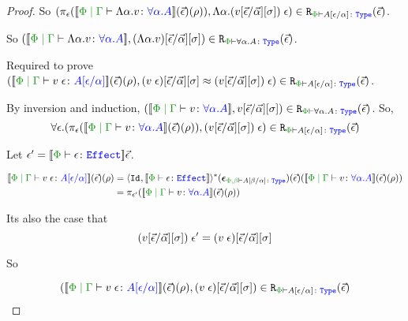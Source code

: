 \begin{framed}
\begin{proof}
        So $\inLogRelPE{    \pe(\deno{\gpetyperelation{\elam{\a}{v}}{\all{\a}{A}}}\fundRho)}{\eapp{\elam{\a}{(v\fundSub)}}{\e}}{A\ssub{\a}{\e}}$.
        
        So $\inLogRelPE{\deno{\gpetyperelation{\elam{\a}{v}}{\all{\a}{A}}}}{(\elam{\a}{v})\fundSub}{\all{\a}{A}}$.
        
        
        \case{\vspec}
        Required to prove $\inLogRelPE{\deno{\gpetyperelation{\eapp{v}{\e}}{A\ssub{\a}{\e}}}\fundRho}{(\eapp{v}{\e})\fundSub\beequiv\eapp{(v\fundSub)}{\e}}{A\ssub{\a}{\e}}$.
        
        By inversion and induction, $\inLogRelPE{\deno{\gpetyperelation{v}{\all{\a}{A}}}}{v\fundSub}{\all{\a}{A}}$. So, $$\forall\e. \inLogRelPE{\pe(\deno{\gpetyperelation{v}{\all{\a}{A}}}\fundRho)}{\eapp{(v\fundSub)}{\e}}{A\ssub{\a}{\e}}$$
        
        Let $\e' = \deno{\wellformede{\P}{\e}}\ev$.
        
        \begin{align*}
            \deno{\gpetyperelation{\eapp{v}{\e}}{A\ssub{\a}{\e}}}\fundRho 
            & = \pr{\Id{}}{\deno{\wellformede{\P}{\e}}}\star(\counit{\wellformedt{\P,\b}{A\ssub{\a}{\b}}})(\ev)(\deno{\gpetyperelation{v}{\all{\a}{A}}}\fundRho)\\
            & = \pi_{\e'}(\deno{\gpetyperelation{v}{\all{\a}{A}}}\fundRho)
        \end{align*}
        
        Its also the case that
        \begin{equation}
            (v[\vec{\epsilon} / \vec{\alpha}][\sigma])\;\epsilon' = (v\;\epsilon)[\vec{\epsilon} / \vec{\alpha}][\sigma]
        \end{equation}
        
        So
        
        \begin{equation}
            \inLogRelPE{\deno{\gpetyperelation{\eapp{v}{\e}}{A\ssub{\a}{\e}}}\fundRho }{(\eapp{v}{\e})\fundSub}{A\ssub{\a}{\e}}
        \end{equation}
    \end{proof}
\end{framed}
